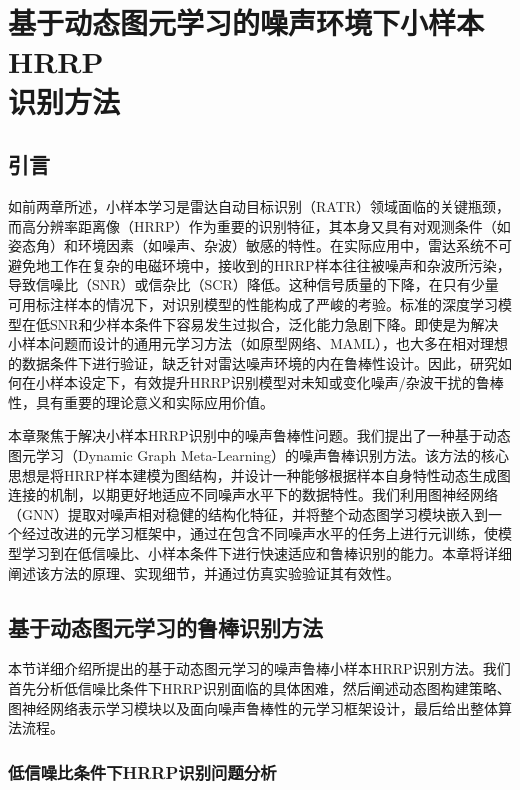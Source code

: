 \chapter{基于动态图元学习的噪声环境下小样本HRRP\\识别方法}
\label{chap:noise_robust}

\section{引言}
\label{sec:noise_intro}

如前两章所述，小样本学习是雷达自动目标识别（RATR）领域面临的关键瓶颈，而高分辨率距离像（HRRP）作为重要的识别特征，其本身又具有对观测条件（如姿态角）和环境因素（如噪声、杂波）敏感的特性。在实际应用中，雷达系统不可避免地工作在复杂的电磁环境中，接收到的HRRP样本往往被噪声和杂波所污染，导致信噪比（SNR）或信杂比（SCR）降低。这种信号质量的下降，在只有少量可用标注样本的情况下，对识别模型的性能构成了严峻的考验。标准的深度学习模型在低SNR和少样本条件下容易发生过拟合，泛化能力急剧下降。即使是为解决小样本问题而设计的通用元学习方法（如原型网络、MAML），也大多在相对理想的数据条件下进行验证，缺乏针对雷达噪声环境的内在鲁棒性设计。因此，研究如何在小样本设定下，有效提升HRRP识别模型对未知或变化噪声/杂波干扰的鲁棒性，具有重要的理论意义和实际应用价值。

本章聚焦于解决小样本HRRP识别中的噪声鲁棒性问题。我们提出了一种基于动态图元学习（Dynamic Graph Meta-Learning）的噪声鲁棒识别方法。该方法的核心思想是将HRRP样本建模为图结构，并设计一种能够根据样本自身特性动态生成图连接的机制，以期更好地适应不同噪声水平下的数据特性。我们利用图神经网络（GNN）提取对噪声相对稳健的结构化特征，并将整个动态图学习模块嵌入到一个经过改进的元学习框架中，通过在包含不同噪声水平的任务上进行元训练，使模型学习到在低信噪比、小样本条件下进行快速适应和鲁棒识别的能力。本章将详细阐述该方法的原理、实现细节，并通过仿真实验验证其有效性。

\section{基于动态图元学习的鲁棒识别方法}
\label{sec:methodology}

本节详细介绍所提出的基于动态图元学习的噪声鲁棒小样本HRRP识别方法。我们首先分析低信噪比条件下HRRP识别面临的具体困难，然后阐述动态图构建策略、图神经网络表示学习模块以及面向噪声鲁棒性的元学习框架设计，最后给出整体算法流程。

\subsection{低信噪比条件下HRRP识别问题分析}
\label{subsec:noise_challenge_analysis}

